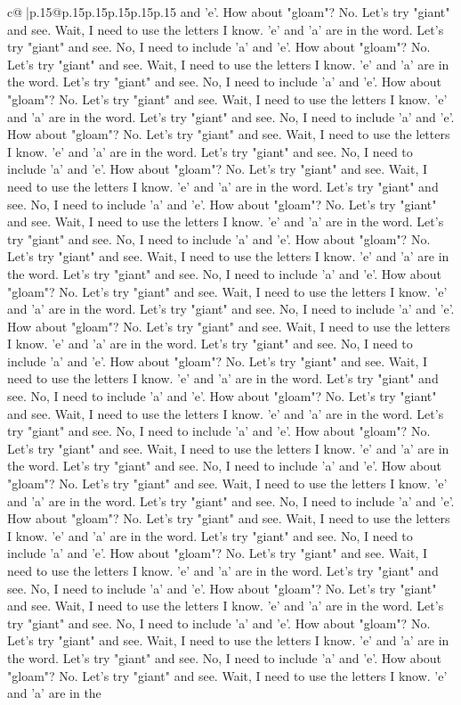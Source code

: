 \documentclass{article}
\begin{document}
{\begin{supertabular}{c@{$\;$}|p{.15\linewidth}@{}p{.15\linewidth}p{.15\linewidth}p{.15\linewidth}p{.15\linewidth}p{.15\linewidth}}
{{{and 'e'. How about "gloam"? No. Let's try "giant" and see. Wait, I need to use the letters I know. 'e' and 'a' are in the word. Let's try "giant" and see. No, I need to include 'a' and 'e'. How about "gloam"? No. Let's try "giant" and see. Wait, I need to use the letters I know. 'e' and 'a' are in the word. Let's try "giant" and see. No, I need to include 'a' and 'e'. How about "gloam"? No. Let's try "giant" and see. Wait, I need to use the letters I know. 'e' and 'a' are in the word. Let's try "giant" and see. No, I need to include 'a' and 'e'. How about "gloam"? No. Let's try "giant" and see. Wait, I need to use the letters I know. 'e' and 'a' are in the word. Let's try "giant" and see. No, I need to include 'a' and 'e'. How about "gloam"? No. Let's try "giant" and see. Wait, I need to use the letters I know. 'e' and 'a' are in the word. Let's try "giant" and see. No, I need to include 'a' and 'e'. How about "gloam"? No. Let's try "giant" and see. Wait, I need to use the letters I know. 'e' and 'a' are in the word. Let's try "giant" and see. No, I need to include 'a' and 'e'. How about "gloam"? No. Let's try "giant" and see. Wait, I need to use the letters I know. 'e' and 'a' are in the word. Let's try "giant" and see. No, I need to include 'a' and 'e'. How about "gloam"? No. Let's try "giant" and see. Wait, I need to use the letters I know. 'e' and 'a' are in the word. Let's try "giant" and see. No, I need to include 'a' and 'e'. How about "gloam"? No. Let's try "giant" and see. Wait, I need to use the letters I know. 'e' and 'a' are in the word. Let's try "giant" and see. No, I need to include 'a' and 'e'. How about "gloam"? No. Let's try "giant" and see. Wait, I need to use the letters I know. 'e' and 'a' are in the word. Let's try "giant" and see. No, I need to include 'a' and 'e'. How about "gloam"? No. Let's try "giant" and see. Wait, I need to use the letters I know. 'e' and 'a' are in the word. Let's try "giant" and see. No, I need to include 'a' and 'e'. How about "gloam"? No. Let's try "giant" and see. Wait, I need to use the letters I know. 'e' and 'a' are in the word. Let's try "giant" and see. No, I need to include 'a' and 'e'. How about "gloam"? No. Let's try "giant" and see. Wait, I need to use the letters I know. 'e' and 'a' are in the word. Let's try "giant" and see. No, I need to include 'a' and 'e'. How about "gloam"? No. Let's try "giant" and see. Wait, I need to use the letters I know. 'e' and 'a' are in the word. Let's try "giant" and see. No, I need to include 'a' and 'e'. How about "gloam"? No. Let's try "giant" and see. Wait, I need to use the letters I know. 'e' and 'a' are in the word. Let's try "giant" and see. No, I need to include 'a' and 'e'. How about "gloam"? No. Let's try "giant" and see. Wait, I need to use the letters I know. 'e' and 'a' are in the word. Let's try "giant" and see. No, I need to include 'a' and 'e'. How about "gloam"? No. Let's try "giant" and see. Wait, I need to use the letters I know. 'e' and 'a' are in the word. Let's try "giant" and see. No, I need to include 'a' and 'e'. How about "gloam"? No. Let's try "giant" and see. Wait, I need to use the letters I know. 'e' and 'a' are in the }}}
\end{supertabular}}
\end{document}
